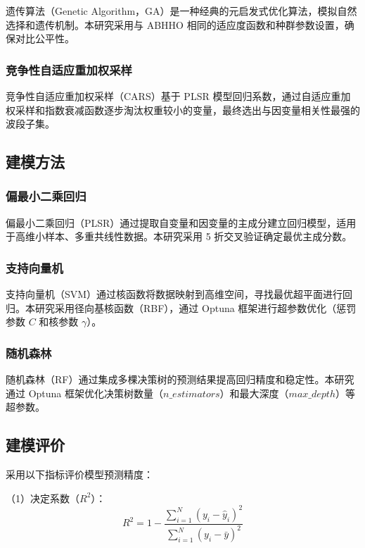 \documentclass[12pt,a4paper]{article}
\begin{document}
遗传算法（Genetic Algorithm，GA）是一种经典的元启发式优化算法，模拟自然选择和遗传机制。本研究采用与 ABHHO 相同的适应度函数和种群参数设置，确保对比公平性。

\subsubsection{竞争性自适应重加权采样}

竞争性自适应重加权采样（CARS）基于 PLSR 模型回归系数，通过自适应重加权采样和指数衰减函数逐步淘汰权重较小的变量，最终选出与因变量相关性最强的波段子集。

\subsection{建模方法}

\subsubsection{偏最小二乘回归}

偏最小二乘回归（PLSR）通过提取自变量和因变量的主成分建立回归模型，适用于高维小样本、多重共线性数据。本研究采用 5 折交叉验证确定最优主成分数。

\subsubsection{支持向量机}

支持向量机（SVM）通过核函数将数据映射到高维空间，寻找最优超平面进行回归。本研究采用径向基核函数（RBF），通过 Optuna 框架进行超参数优化（惩罚参数 $C$ 和核参数 $\gamma$）。

\subsubsection{随机森林}

随机森林（RF）通过集成多棵决策树的预测结果提高回归精度和稳定性。本研究通过 Optuna 框架优化决策树数量（$n\_estimators$）和最大深度（$max\_depth$）等超参数。

\subsection{建模评价}

采用以下指标评价模型预测精度：

（1）决定系数（$R^2$）：
\begin{equation}
    R^2 = 1 - \frac{\sum_{i=1}^{N}(y_i - \hat{y}_i)^2}{\sum_{i=1}^{N}(y_i - \bar{y})^2}
    \label{eq:r2}
\end{equation}
\end{document}
